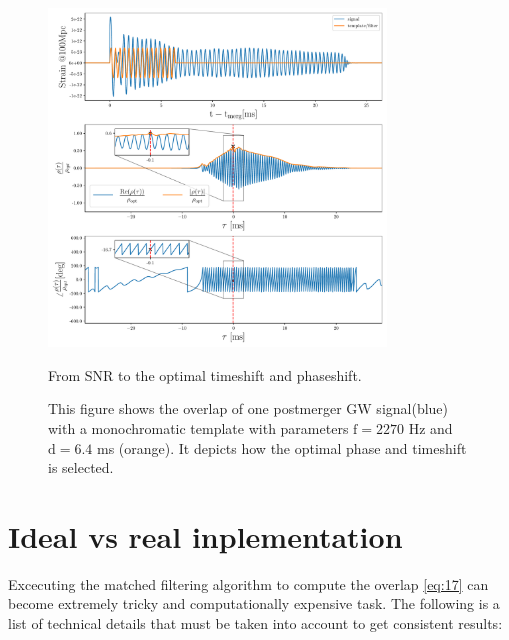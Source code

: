 \begin{figure}[hbt!]
\begin{center}
\includegraphics[width=0.8\textwidth, angle=0]{images/Data_analysis/results/ex_search.pdf}
\captionsetup{width=0.8\textwidth}
\caption{From SNR to the optimal timeshift and phaseshift.}
\caption*{This figure shows the overlap of one postmerger GW signal(blue) with a monochromatic template with parameters $\mathrm{f=2270}$ Hz and $\mathrm{d=6.4}$ ms (orange). It depicts how the optimal phase and timeshift is selected.
}
\label{fig:7}
\end{center}
\end{figure}

\FloatBarrier



\section{Ideal vs real inplementation}

Excecuting the matched filtering algorithm to compute the overlap \ref{eq:17} can become extremely tricky and computationally expensive task. The following is a list of technical details that must be taken into account to get consistent results:

